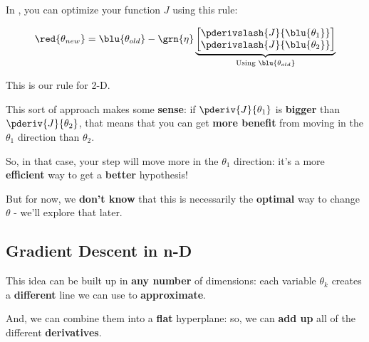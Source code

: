         \begin{kequation}
            In , you can optimize your function $J$ using this rule:
            
            \begin{equation*}
                \red{ \theta_{new} } =  \blu{ \theta_{old} } 
                - \grn{ \eta } 
                \underbrace{
                    \begin{bmatrix}
                          \pderivslash{J}{ \blu{\theta_1} } \\ 
                          \pderivslash{J}{ \blu{\theta_2} } 
                    \end{bmatrix}
                }_{ \text{Using } \blu{ \theta_{old} } }
            \end{equation*}
            
            This is our  rule for 2-D.
        \end{kequation}
        
        This sort of approach makes some \textbf{sense}: if $\pderiv{J}{\theta_1}$ is \textbf{bigger} than $\pderiv{J}{\theta_2}$, that means that you can get \textbf{more benefit} from moving in the $\theta_1$ direction than $\theta_2$.
        
        So, in that case, your step will move more in the $\theta_1$ direction: it's a more \textbf{efficient} way to get a \textbf{better} hypothesis!
        
        But for now, we \textbf{don't know} that this is necessarily the \textbf{optimal} way to change $\theta$ - we'll explore that later.
        
        
    \subsection{Gradient Descent in n-D}
    
        This idea can be built up in \textbf{any number} of dimensions: each variable $\theta_k$ creates a \textbf{different} line we can use to \textbf{approximate}.
        
        And, we can combine them into a \textbf{flat} hyperplane: so, we can \textbf{add up} all of the different \textbf{derivatives}.\\
        
